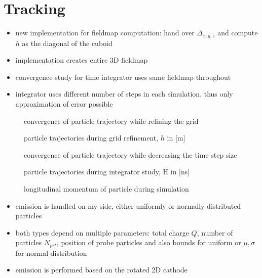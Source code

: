 \section{Tracking}
\begin{itemize}
  \item new implementation for fieldmap computation: hand over $\Delta_{x,y,z}$ and compute $h$ as the diagonal of the cuboid
  \item implementation creates entire 3D fieldmap
  \item convergence study for time integrator uses same fieldmap throughout
  \item integrator uses different number of steps in each simulation, thus only approximation of error possible
\end{itemize}

\begin{center}
\begin{figure}[p]
  
  \caption{convergence of particle trajectory while refining the grid}
\end{figure}
\end{center}

\begin{center}
\begin{figure}[p]
  
  \caption{particle trajectories during grid refinement, $h$ in [m]}
\end{figure}
\end{center}

\begin{center}
\begin{figure}[p]
  
  \caption{convergence of particle trajectory while decreasing the time step size}
\end{figure}
\end{center}

\begin{center}
\begin{figure}[p]
  
    \caption{particle trajectories during integrator study, H in [ns]}
\end{figure}
\end{center}

\begin{center}
\begin{figure}[H]
  
    \caption{longitudinal momentum of particle during simulation}
\end{figure}
\end{center}

\begin{itemize}
  \item emission is handled on my side, either uniformly or normally distributed particles
  \item both types depend on multiple parameters: total charge $Q$, number of particles $N_{prt}$, position of probe particles and also bounds for uniform or $\mu, \sigma$ for normal distribution
  \item emission is performed based on the rotated 2D cathode
\end{itemize}
